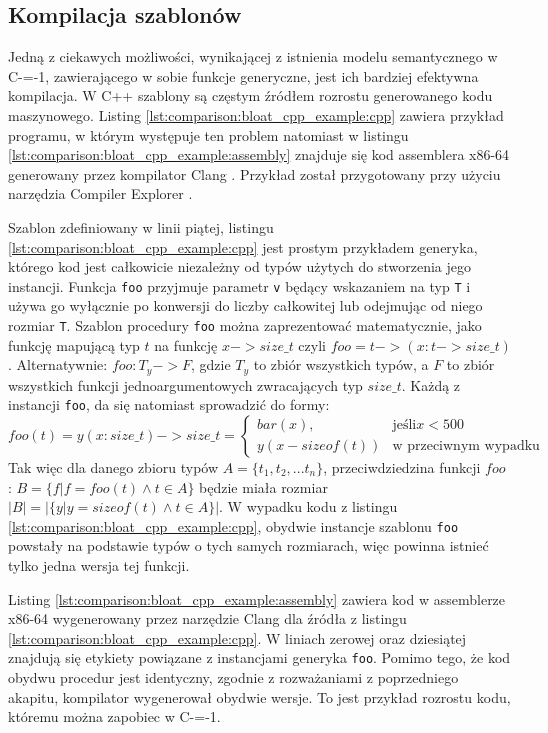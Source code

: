 \subsection{Kompilacja szablonów}
\label{comparison:template_type_erasure}
Jedną z ciekawych możliwości, wynikającej z istnienia modelu semantycznego w C-=-1, zawierającego w sobie funkcje generyczne, jest ich bardziej efektywna kompilacja.
W C++ szablony są częstym źródłem rozrostu generowanego kodu maszynowego.
Listing \ref{lst:comparison:bloat_cpp_example:cpp} zawiera przykład programu, w którym występuje ten problem natomiast w listingu \ref{lst:comparison:bloat_cpp_example:assembly} znajduje się kod assemblera x86-64 generowany przez kompilator Clang \cite{lattner2008llvm}.
Przykład został przygotowany przy użyciu narzędzia Compiler Explorer \cite{godbolt}.

Szablon zdefiniowany w linii piątej, listingu \ref{lst:comparison:bloat_cpp_example:cpp} jest prostym przykładem generyka, którego kod jest całkowicie niezależny od typów użytych do stworzenia jego instancji.
Funkcja \lstinline{foo} przyjmuje parametr \lstinline{v} będący wskazaniem na typ \lstinline{T} i używa go wyłącznie po konwersji do liczby całkowitej lub odejmując od niego rozmiar \lstinline{T}.
Szablon procedury \lstinline{foo} można zaprezentować matematycznie, jako funkcję mapującą typ \(t\) na funkcję \(x -> size\_t\) czyli \( foo = t -> (x: t -> size\_t)\). Alternatywnie: \(foo : T_y -> F\), gdzie \(T_y\) to zbiór wszystkich typów, a \(F\) to zbiór wszystkich funkcji jednoargumentowych zwracających typ \(size\_t\).
Każdą z instancji \lstinline{foo}, da się natomiast sprowadzić do formy:\\
\(foo(t) = y(x: size\_t) -> size\_t = \begin{cases}
  bar(x), & \text{jeśli} x < 500 \\
  y(x - sizeof(t)) & \text{w przeciwnym wypadku}
\end{cases}\)\\
Tak więc dla danego zbioru typów \(A = \{t_1, t_2, ... t_n\}\), przeciwdziedzina funkcji \(foo\) : \(B = \{ f | f = foo(t) \land t \in A\}\) będzie miała rozmiar \(|B| = |\{y | y = sizeof(t) \land t \in A\}|\).
W wypadku kodu z listingu \ref{lst:comparison:bloat_cpp_example:cpp}, obydwie instancje szablonu \lstinline{foo} powstały na podstawie typów o tych samych rozmiarach, więc powinna istnieć tylko jedna wersja tej funkcji.

Listing \ref{lst:comparison:bloat_cpp_example:assembly} zawiera kod w assemblerze x86-64 wygenerowany przez narzędzie Clang dla źródła z listingu \ref{lst:comparison:bloat_cpp_example:cpp}.
W liniach zerowej oraz dziesiątej znajdują się etykiety powiązane z instancjami generyka \lstinline{foo}.
Pomimo tego, że kod obydwu procedur jest identyczny, zgodnie z rozważaniami z poprzedniego akapitu, kompilator wygenerował obydwie wersje.
To jest przykład rozrostu kodu, któremu można zapobiec w C-=-1.

